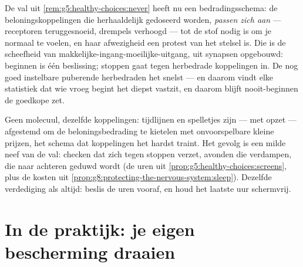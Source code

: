 \begin{remark}\label{rem:g8:protecting-the-nervous-system:addiction}
De val uit \cref{rem:g5:healthy-choices:never} heeft nu een
bedradingsschema: de beloningskoppelingen die herhaaldelijk gedoseerd
worden, \emph{passen zich aan} --- receptoren teruggesnoeid, drempels
verhoogd --- tot de stof nodig is om je normaal te voelen, en haar
afwezigheid een protest van het stelsel is. Die  is de
scheefheid van makkelijke-ingang-moeilijke-uitgang, uit synapsen
opgebouwd: beginnen is één beslissing; stoppen gaat tegen herbedrade
koppelingen in. De nog goed instelbare puberende  herbedraden het
snelst --- en daarom vindt elke statistiek dat wie vroeg begint het diepst
vastzit, en daarom blijft nooit-beginnen de goedkope zet.
\end{remark}

\begin{example}[De schermlus]\label{ex:g8:protecting-the-nervous-system:screens}
Geen molecuul, dezelfde koppelingen: tijdlijnen en spelletjes zijn ---
met opzet --- afgestemd om de beloningsbedrading te kietelen met
onvoorspelbare kleine prijzen, het schema dat koppelingen het hardst
traint. Het gevolg is een milde neef van de val: checken dat zich tegen
stoppen verzet, avonden die verdampen,  die naar achteren geduwd
wordt (de uren uit \cref{prop:g5:healthy-choices:screens}, plus de kosten
uit \cref{prop:g8:protecting-the-nervous-system:sleep}). Dezelfde
verdediging als altijd: beslis de uren vooraf, en houd het laatste uur
schermvrij.
\end{example}

\section{In de praktijk: je eigen bescherming draaien}

